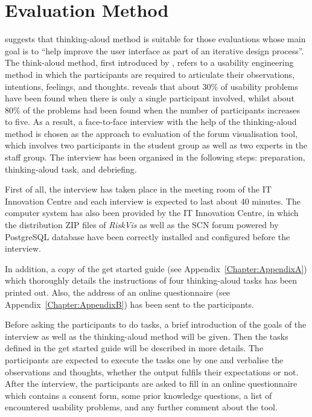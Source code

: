 \section{Evaluation Method}
\citep{Nielsen1993} suggests that thinking-aloud method is suitable for those evaluations whose main goal is to ``help improve the user interface as part of an iterative design process''. The think-aloud method, first introduced by \citep{Lewis1982a}, refers to a usability engineering method in which the participants are required to articulate their observations, intentions, feelings, and thoughts. \citep{Nielsen1994} reveals that about 30\% of usability problems have been found when there is only a single participant involved, whilst about 80\% of the problems had been found when the number of participants increases to five.
As a result, a face-to-face interview with the help of the thinking-aloud method is chosen as the approach to evaluation of the forum visualisation tool, which involves two participants in the student group as well as two experts in the staff group. The interview has been organised in the following steps: preparation, thinking-aloud task, and debriefing.

First of all, the interview has taken place in the meeting room of the IT Innovation Centre and each interview is expected to last about 40 minutes. The computer system has also been provided by the IT Innovation Centre, in which the distribution ZIP files of \emph{RiskVis} as well as the SCN forum powered by PostgreSQL database have been correctly installed and configured before the interview.

In addition, a copy of the get started guide (see Appendix~\ref{Chapter:AppendixA}) which thoroughly details the instructions of four thinking-aloud tasks has been printed out. Also, the address of an online questionnaire (see Appendix~\ref{Chapter:AppendixB}) has been sent to the participants.

Before asking the participants to do tasks, a brief introduction of the goals of the interview as well as the thinking-aloud method will be given. Then the tasks defined in the get started guide will be described in more details. The participants are expected to execute the tasks one by one and verbalise the observations and thoughts, whether the output fulfils their expectations or not. 
After the interview, the participants are asked to fill in an online questionnaire which contains a consent form, some prior knowledge questions, a list of encountered usability problems, and any further comment about the tool.

